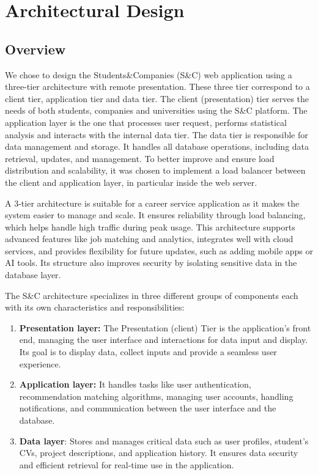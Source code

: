 \chapter{Architectural Design}

\section{Overview}
We chose to design the Students\&Companies (S\&C) web application using a three-tier architecture with remote presentation. These three tier correspond to a client tier, application tier and data tier. The client (presentation) tier serves the needs of both students, companies and universities using the S\&C platform. The application layer is the one that processes user request, performs statistical analysis and interacts with the internal data tier. The data tier is responsible for data management and storage. It handles all database operations, including data retrieval, updates, and management. To better improve and ensure load distribution and scalability, it was chosen to implement a load balancer between the client and application layer, in particular inside the web server.

A 3-tier architecture is suitable for a career service application as it makes the system easier to manage and scale. It ensures reliability through load balancing, which helps handle high traffic during peak usage. This architecture supports advanced features like job matching and analytics, integrates well with cloud services, and provides flexibility for future updates, such as adding mobile apps or AI tools. Its structure also improves security by isolating sensitive data in the database layer.

The S\&C architecture specializes in three different groups of components each with its own characteristics and responsibilities:
\begin{enumerate}
    \item \textbf{Presentation layer:} The Presentation (client) Tier is the application's front end, managing the user interface and interactions for data input and display. Its goal is to display data, collect inputs and provide a seamless user experience. 
    \item \textbf{Application layer:} It handles tasks like user authentication, recommendation matching algorithms, managing user accounts, handling notifications, and communication between the user interface and the database.
    \item \textbf{Data layer}: Stores and manages critical data such as user profiles, student's CVs, project descriptions, and application history. It ensures data security and efficient retrieval for real-time use in the application.
\end{enumerate}

